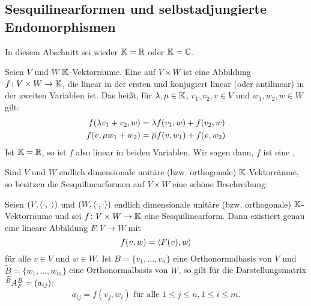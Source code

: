 \subsection{Sesquilinearformen und selbstadjungierte Endomorphismen}
\label{sec:2.5}

In diesem Abschnitt sei wieder $\mathbb{K} = \mathbb{R}$ oder $\mathbb{K}= \mathbb{C}$.

\begin{definition}
	\label{def:5.1}
	Seien $V$ und $W$ $\mathbb{K}$-Vektorräume.
	Eine  auf $V \times W$ ist eine Abbildung $f \colon V \times W \rightarrow \mathbb{K}$, die linear in der ersten und konjugiert linear (oder antilinear) in der zweiten Variablen ist.
	Das heißt, für $\lambda, \mu \in \mathbb{K}$, $v_1,v_2,v \in V$ und $w_1,w_2,w \in W$ gilt:
	\begin{align*}
		f(\lambda v_1 + v_2, w) &= \lambda f(v_1,w) + f(v_2,w) \\
		f(v,\mu w_1 + w_2) &= \overline{\mu} f(v,w_1) + f(v,w_2)
	\end{align*}
	Ist $\mathbb{K}= \mathbb{R}$, so ist $f$ also linear in beiden Variablen.
	Wir sagen dann, $f$ ist eine ,
\end{definition}

Sind $V$ und $W$ endlich dimensionale unitäre (bzw. orthogonale) $\mathbb{K}$-Vektorräume, so besitzen die Sesquilinearformen auf $V \times W$ eine schöne Beschreibung:

\begin{satz}
	\label{satz:5.2}
	Seien $(V,\left\langle\cdot,\cdot\right\rangle)$ und $(W,\left\langle\cdot,\cdot\right\rangle)$ endlich dimensionale unitäre (bzw. orthogonale) $\mathbb{K}$-Vektorräume und sei $f \colon V \times W \rightarrow \mathbb{K}$ eine Sesquilinearform.
	Dann existiert genau eine lineare Abbildung $F \colon V \rightarrow W$ mit
	\[
		f(v,w) = \left\langle F(v),w\right\rangle
	\]
	für alle $v \in V$ und $w \in W$.
	Ist $B = \{v_1,\dots,v_n\}$ eine Orthonormalbasis von $V$ und $\widetilde{B} = \{w_1,\dots,w_m\}$ eine Orthonormalbasis von $W$, so gilt für die Darstellungsmatrix $\mat{A}{\wt{B}}{B}{F} = (a_{ij})$:
	\[
		a_{ij} = f(v_j,w_i)	\text{ für alle } 1\leq j \leq n, 1 \leq i \leq m.
	\]
\end{satz}

